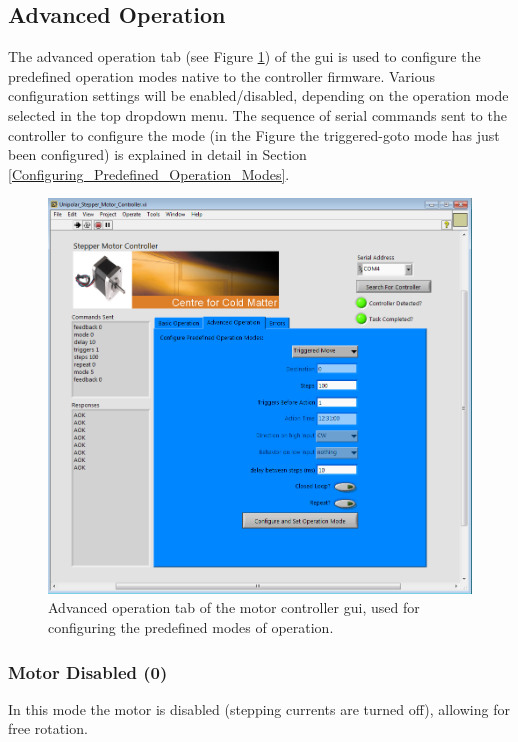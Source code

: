\documentclass[10pt]{article}
\begin{document}
\FloatBarrier
\subsection{Advanced Operation}
\label{Advanced_Operation}

The advanced operation tab (see Figure \ref{GUI_Advanced_Operation}) of the gui is used to configure the predefined operation modes native to the controller firmware.  Various configuration settings will be enabled/disabled, depending on the operation mode selected in the top dropdown menu.  The sequence of serial commands sent to the controller to configure the mode (in the Figure the triggered-goto mode has just been configured) is explained in detail in Section \ref{Configuring_Predefined_Operation_Modes}.  

\begin{figure}[!htb]
\centering
\includegraphics[width=\linewidth]{Figures/GUI_Advanced_Operation.png}
\caption{Advanced operation tab of the motor controller gui, used for configuring the predefined modes of operation.}
\label{GUI_Advanced_Operation}
\end{figure}

\subsubsection{Motor Disabled (0)}
In this mode the motor is disabled (stepping currents are turned off), allowing for free rotation.  
\end{document}
